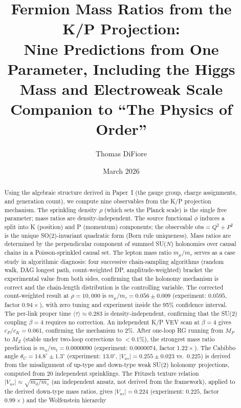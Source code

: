 \documentclass[11pt,letterpaper]{article}
\title{Fermion Mass Ratios from the K/P Projection:\\
  Nine Predictions from One Parameter, Including the Higgs Mass and Electroweak Scale\\[6pt]
  \large Companion to ``The Physics of Order''}
\author{Thomas DiFiore}
\date{March 2026}
\begin{document}
\maketitle

\begin{abstract}
Using the algebraic structure derived in Paper~I (the gauge group,
charge assignments, and generation count), we compute nine
observables from the K/P projection mechanism.  The sprinkling
density $\rho$ (which sets the Planck scale) is the single free
parameter; mass ratios are density-independent. The source functional $\phi$ induces a split into K
(position) and P (momentum) components; the observable
$\mathrm{obs} = Q^2 + P^2$ is the unique SO(2)-invariant quadratic
form (Born rule uniqueness). Mass ratios are determined by the
perpendicular component of summed SU($N$) holonomies over causal
chains in a Poisson-sprinkled causal set.  The lepton mass ratio
$m_\mu/m_\tau$ serves as a case study in algorithmic diagnosis:
four successive chain-sampling algorithms (random walk, DAG longest
path, count-weighted DP, amplitude-weighted) bracket the experimental
value from both sides, confirming that the holonomy mechanism is
correct and the chain-length distribution is the controlling variable.
The corrected count-weighted result at $\rho = 10{,}000$ is
$m_\mu/m_\tau = 0.056 \pm 0.009$ (experiment: $0.0595$, factor
$0.94\times$), with zero tuning and experiment inside the 95\%
confidence interval.  The per-link proper time
$\langle\tau\rangle \approx 0.283$ is density-independent, confirming
that the SU(2) coupling $\beta = 4$ requires no correction.
An independent K/P VEV scan at $\beta = 4$ gives
$c_P/c_K = 0.061$, confirming the mechanism to 2\%.  After one-loop RG running
from $M_P$ to $M_Z$ (stable under two-loop corrections to
$< 0.1\%$), the strongest mass ratio prediction is $m_u/m_t = 0.0000090$
(experiment: $0.0000074$, factor $1.22\times$).  The Cabibbo angle
$\theta_C = 14.8^\circ \pm 1.3^\circ$ (experiment: $13.0^\circ$,
$|V_{us}| = 0.255 \pm 0.023$ vs.\ $0.225$) is derived from the
misalignment of up-type and down-type weak SU(2) holonomy projections,
computed from 20 independent sprinklings.  The Fritzsch texture
relation $|V_{us}| \approx \sqrt{m_d/m_s}$ (an independent ansatz,
not derived from the framework), applied to the derived
down-type mass ratios, gives $|V_{us}| = 0.224$ (experiment: $0.225$,
factor $0.99\times$) and the Wolfenstein hierarchy

\end{abstract}
\end{document}
